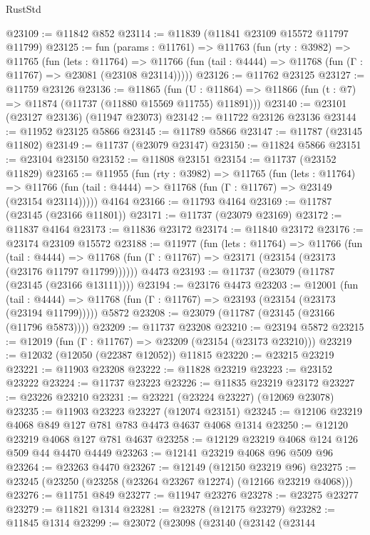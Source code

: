 \begin{lexlean}{RustStd}
\begin{coremodule}
@23109 := @11842 @852
@23114 := @11839 (@11841 @23109 @15572 @11797 @11799)
@23125 := fun (params : @11761) =>
  @11763
    (fun (rty : @3982) =>
    @11765
      (fun (lets : @11764) =>
      @11766 (fun (tail : @4444) => @11768 (fun (Γ : @11767) => @23081 (@23108 @23114)))))
@23126 := @11762 @23125
@23127 := @11759 @23126
@23136 := @11865
    (fun (U : @11864) => @11866 (fun (t : @7) => @11874 (@11737 (@11880 @15569 @11755) @11891)))
@23140 := @23101 (@23127 @23136) (@11947 @23073)
@23142 := @11722 @23126 @23136
@23144 := @11952 @23125 @5866
@23145 := @11789 @5866
@23147 := @11787 (@23145 @11802)
@23149 := @11737 (@23079 @23147)
@23150 := @11824 @5866
@23151 := @23104 @23150
@23152 := @11808 @23151
@23154 := @11737 (@23152 @11829)
@23165 := @11955
    (fun (rty : @3982) =>
    @11765
      (fun (lets : @11764) =>
      @11766 (fun (tail : @4444) => @11768 (fun (Γ : @11767) => @23149 (@23154 @23114)))))
    @4164
@23166 := @11793 @4164
@23169 := @11787 (@23145 (@23166 @11801))
@23171 := @11737 (@23079 @23169)
@23172 := @11837 @4164
@23173 := @11836 @23172
@23174 := @11840 @23172
@23176 := @23174 @23109 @15572
@23188 := @11977
    (fun (lets : @11764) =>
    @11766
      (fun (tail : @4444) =>
      @11768 (fun (Γ : @11767) => @23171 (@23154 (@23173 (@23176 @11797 @11799))))))
    @4473
@23193 := @11737 (@23079 (@11787 (@23145 (@23166 @13111))))
@23194 := @23176 @4473
@23203 := @12001
    (fun (tail : @4444) => @11768 (fun (Γ : @11767) => @23193 (@23154 (@23173 (@23194 @11799)))))
    @5872
@23208 := @23079 (@11787 (@23145 (@23166 (@11796 @5873))))
@23209 := @11737 @23208
@23210 := @23194 @5872
@23215 := @12019 (fun (Γ : @11767) => @23209 (@23154 (@23173 @23210)))
@23219 := @12032 (@12050 (@22387 @12052)) @11815
@23220 := @23215 @23219
@23221 := @11903 @23208
@23222 := @11828 @23219
@23223 := @23152 @23222
@23224 := @11737 @23223
@23226 := @11835 @23219 @23172
@23227 := @23226 @23210
@23231 := @23221 (@23224 @23227) (@12069 @23078)
@23235 := @11903 @23223 @23227 (@12074 @23151)
@23245 := @12106 @23219 @4068 @849 @127 @781 @783 @4473 @4637 @4068 @1314
@23250 := @12120 @23219 @4068 @127 @781 @4637
@23258 := @12129 @23219 @4068 @124 @126 @509 @44 @4470 @4449
@23263 := @12141 @23219 @4068 @96 @509 @96
@23264 := @23263 @4470
@23267 := @12149 (@12150 @23219 @96)
@23275 := @23245 (@23250 (@23258 (@23264 @23267 @12274) (@12166 @23219 @4068)))
@23276 := @11751 @849
@23277 := @11947 @23276
@23278 := @23275 @23277
@23279 := @11821 @1314
@23281 := @23278 (@12175 @23279)
@23282 := @11845 @1314
@23299 := @23072
    (@23098
      (@23140
        (@23142
          (@23144

\end{coremodule}
\end{lexlean}
